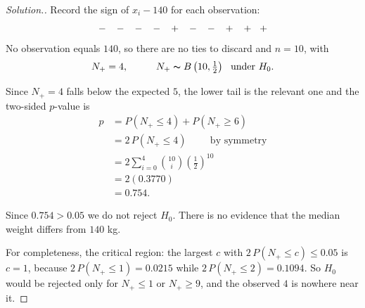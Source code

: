 \documentclass[11pt,a4paper]{article}
\theoremstyle{definition}
\newenvironment{solution}
  {\renewcommand{\qedsymbol}{}\begin{proof}[\textit{Solution}.]}
  {\end{proof}}
\begin{document}
\begin{solution}
Record the sign of $x_i-140$ for each observation:
$$-\hspace{0.3cm}-\hspace{0.3cm}-\hspace{0.3cm}-\hspace{0.3cm}+\hspace{0.3cm}-\hspace{0.3cm}-\hspace{0.3cm}+\hspace{0.3cm}+\hspace{0.3cm}+$$
No observation equals $140$, so there are no ties to discard and $n=10$, with
$$N_+=4,\hspace{1cm}N_+\thicksim B\left(10,\tfrac{1}{2}\right)\ \text{ under } H_0 .$$

Since $N_+=4$ falls below the expected $5$, the lower tail is the relevant one and
the two-sided $p$-value is
\begin{align*}
p &=P\left(N_+\leq 4\right)+P\left(N_+\geq 6\right)\\
  &=2\,P\left(N_+\leq 4\right)\hspace{1cm}\text{by symmetry}\\
  &=2\sum^{4}_{i=0}\binom{10}{i}\left(\tfrac{1}{2}\right)^{10}\\
  &=2(0.3770)\\
  &=0.754 .
\end{align*}

Since $0.754>0.05$ we do not reject $H_0$. There is no evidence that the median
weight differs from $140$ kg.

For completeness, the critical region: the largest $c$ with
$2\,P\left(N_+\leq c\right)\leq 0.05$ is $c=1$, because
$2\,P\left(N_+\leq 1\right)=0.0215$ while $2\,P\left(N_+\leq 2\right)=0.1094$. So
$H_0$ would be rejected only for $N_+\leq 1$ or $N_+\geq 9$, and the observed $4$
is nowhere near it.
\end{solution}
\end{document}

